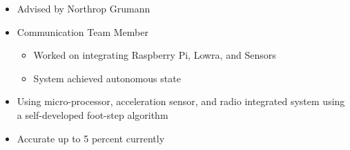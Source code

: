 \documentclass[10pt,a4paper,ragged2e,withhyper]{altacv}
\begin{document}
\begin{paracol}{2}
            \begin{itemize}
                \item Advised by Northrop Grumann
                \item Communication Team Member
                	\begin{itemize}
                		\item Worked on integrating Raspberry Pi, Lowra, and Sensors
               			 \item System achieved autonomous state
            		\end{itemize}
            \end{itemize}
                                    
            \begin{itemize}
                \item Using micro-processor, acceleration sensor, and radio integrated system using a self-developed foot-step algorithm
                \item Accurate up to 5 percent currently
            \end{itemize}
            
    \end{paracol}
\end{document}
